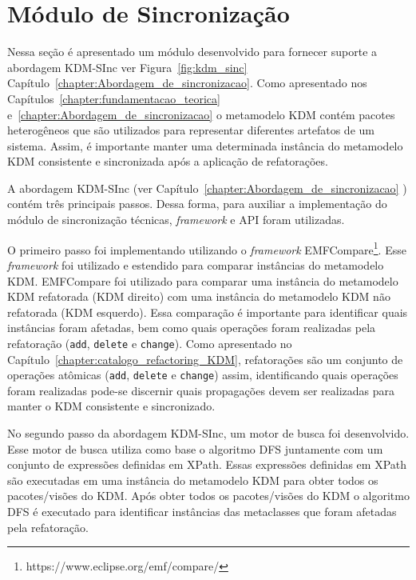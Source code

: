 \section{Módulo de Sincronização}

Nessa seção é apresentado um módulo desenvolvido para fornecer suporte a abordagem KDM-SInc ver Figura~\ref{fig:kdm_sinc} Capítulo~\ref{chapter:Abordagem_de_sincronizacao}. Como apresentado nos Capítulos~\ref{chapter:fundamentacao_teorica} e~\ref{chapter:Abordagem_de_sincronizacao} o metamodelo KDM contém pacotes heterogêneos que são utilizados para representar diferentes artefatos de um sistema. Assim, é importante manter uma determinada instância do metamodelo KDM consistente e sincronizada após a aplicação de refatorações. 

 A abordagem KDM-SInc (ver Capítulo~\ref{chapter:Abordagem_de_sincronizacao} ) contém três principais passos. Dessa forma, para auxiliar a implementação do módulo de sincronização técnicas, \textit{framework} e API foram utilizadas. 
 
 O primeiro passo foi implementando utilizando o \textit{framework} EMFCompare\footnote{https://www.eclipse.org/emf/compare/}. Esse \textit{framework} foi utilizado e estendido para comparar instâncias do metamodelo KDM. EMFCompare foi utilizado para comparar uma instância do metamodelo KDM refatorada (KDM direito) com uma instância do metamodelo KDM não refatorada (KDM esquerdo). Essa comparação é importante para identificar quais instâncias foram afetadas, bem como quais operações foram realizadas pela refatoração (\texttt{add}, \texttt{delete} e \texttt{change}). Como apresentado no Capítulo~\ref{chapter:catalogo_refactoring_KDM}, refatorações são um conjunto de operações atômicas (\texttt{add}, \texttt{delete} e \texttt{change}) assim, identificando quais operações foram realizadas pode-se discernir quais propagações devem ser realizadas para manter o KDM consistente e sincronizado.

No segundo passo da abordagem KDM-SInc, um motor de busca foi desenvolvido. Esse motor de busca utiliza como base o algoritmo DFS juntamente com um conjunto de expressões definidas em XPath. Essas expressões definidas em XPath são executadas em uma instância do metamodelo KDM para obter todos os pacotes/visões do KDM. Após obter todos os pacotes/visões do KDM o algoritmo DFS é executado para identificar instâncias das metaclasses que foram afetadas pela refatoração.


